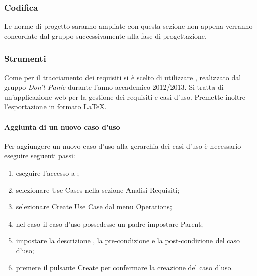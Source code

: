 \documentclass[12pt,a4paper]{article}
\begin{document}
\subsubsection{Codifica}
Le norme di progetto saranno ampliate con questa sezione non appena verranno concordate dal gruppo successivamente alla fase di progettazione.

\subsubsection{Strumenti}

 \label{tracciamento-requisiti}
Come  per il tracciamento dei requisiti si è scelto di utilizzare , realizzato dal gruppo \textit{Don’t Panic} durante l’anno accademico 2012/2013. Si tratta di un’applicazione web per la gestione dei requisiti e casi d’uso. Premette inoltre l’esportazione in formato \LaTeX{}.

\paragraph{Aggiunta di un nuovo caso d'uso}
Per aggiungere un nuovo caso d’uso alla gerarchia dei casi d’uso è necessario eseguire seguenti passi:
\begin{enumerate}
	\item eseguire l'accesso a ;
	\item selezionare Use Cases nella sezione Analisi Requisiti; 
	\item selezionare Create Use Case dal menu Operations;
	\item nel caso il caso d'uso possedesse un padre impostare Parent;
	\item impostare la descrizione , la pre-condizione e la post-condizione del caso d'uso; 
	\item premere il pulsante Create per confermare la creazione del caso d'uso.
\end{enumerate}
\end{document}
